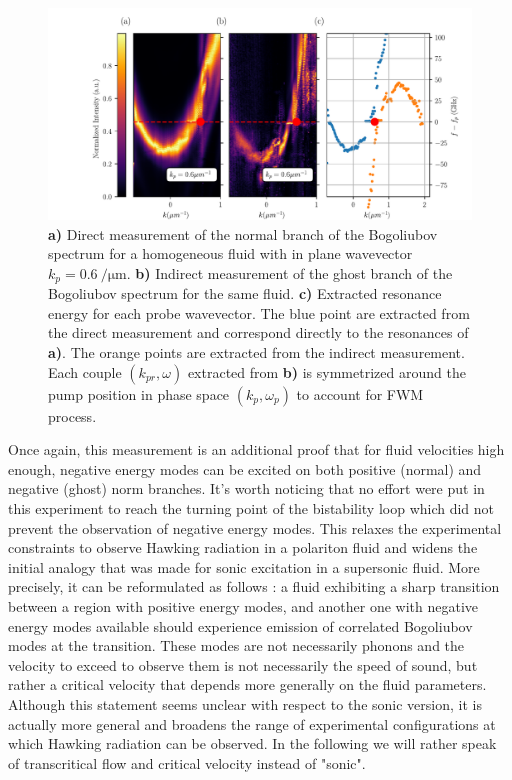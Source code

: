 \begin{figure}[t!]
    \centering
    \includegraphics[width=1\textwidth]{chap_custom_st/fig/supersonic_homogenous.pdf}
    \caption{\textbf{a)} Direct measurement of the normal branch of the Bogoliubov spectrum for a homogeneous fluid with in plane wavevector $k_p=\SI{0.6}{\per \micro \meter}.$ \textbf{\textbf{b)}} Indirect measurement of the ghost branch of the Bogoliubov spectrum for the same fluid.
    \textbf{c)} Extracted resonance energy for each probe wavevector. The blue point are extracted from the direct measurement and correspond directly to the resonances of \textbf{a)}. The orange points are extracted from the indirect measurement. Each couple $(k_{pr}, \omega)$ extracted from \textbf{b)} is symmetrized around the pump position in phase space $(k_p, \omega_p)$ to account for FWM process.}
    \label{fig:homogeneous_fluid_bogo_ghost}
\end{figure}

Once again, this measurement is an additional proof that for fluid velocities high enough, negative energy modes can be excited on both positive (normal) and negative (ghost) norm branches.
It's worth noticing that no effort were put in this experiment to reach the turning point of the bistability loop which did not prevent the observation of negative energy modes. This relaxes 
the experimental constraints to observe Hawking radiation in a polariton fluid and widens the initial analogy that was made for sonic excitation in a supersonic fluid. More precisely, it can be reformulated as follows :
a fluid exhibiting a sharp transition between a region with positive energy modes, and another one with negative energy modes available should experience  emission of correlated Bogoliubov modes at the transition.
These modes are not necessarily phonons and the velocity to exceed to observe them is not necessarily the speed of sound, but rather a critical velocity that depends more generally on the fluid parameters.
Although this statement seems unclear with respect to the sonic version, it is actually more general and broadens the range of experimental configurations at which Hawking radiation can be observed. In the following 
we will rather speak of transcritical flow and critical velocity instead of "sonic".






